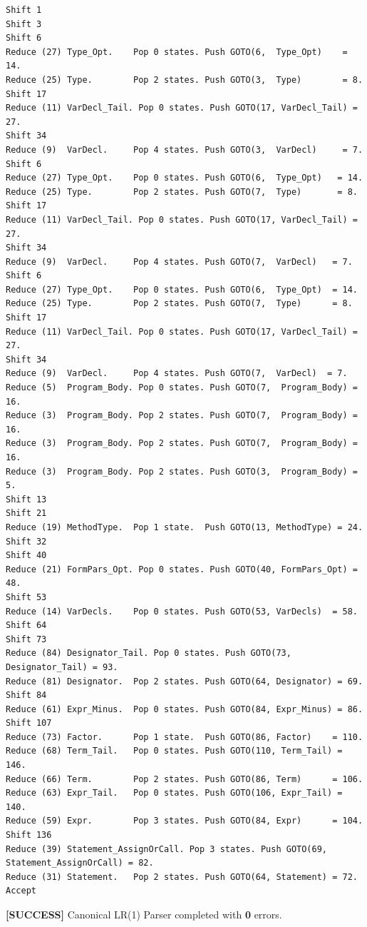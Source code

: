 \documentclass[11pt,a4paper]{article}
\begin{document}
\begin{lstlisting}[style=outputstyle]
Shift 1
Shift 3
Shift 6
Reduce (27) Type_Opt.    Pop 0 states. Push GOTO(6,  Type_Opt)    = 14.
Reduce (25) Type.        Pop 2 states. Push GOTO(3,  Type)        = 8.
Shift 17
Reduce (11) VarDecl_Tail. Pop 0 states. Push GOTO(17, VarDecl_Tail) = 27.
Shift 34
Reduce (9)  VarDecl.     Pop 4 states. Push GOTO(3,  VarDecl)     = 7.
Shift 6
Reduce (27) Type_Opt.    Pop 0 states. Push GOTO(6,  Type_Opt)   = 14.
Reduce (25) Type.        Pop 2 states. Push GOTO(7,  Type)       = 8.
Shift 17
Reduce (11) VarDecl_Tail. Pop 0 states. Push GOTO(17, VarDecl_Tail) = 27.
Shift 34
Reduce (9)  VarDecl.     Pop 4 states. Push GOTO(7,  VarDecl)   = 7.
Shift 6
Reduce (27) Type_Opt.    Pop 0 states. Push GOTO(6,  Type_Opt)  = 14.
Reduce (25) Type.        Pop 2 states. Push GOTO(7,  Type)      = 8.
Shift 17
Reduce (11) VarDecl_Tail. Pop 0 states. Push GOTO(17, VarDecl_Tail) = 27.
Shift 34
Reduce (9)  VarDecl.     Pop 4 states. Push GOTO(7,  VarDecl)  = 7.
Reduce (5)  Program_Body. Pop 0 states. Push GOTO(7,  Program_Body) = 16.
Reduce (3)  Program_Body. Pop 2 states. Push GOTO(7,  Program_Body) = 16.
Reduce (3)  Program_Body. Pop 2 states. Push GOTO(7,  Program_Body) = 16.
Reduce (3)  Program_Body. Pop 2 states. Push GOTO(3,  Program_Body) = 5.
Shift 13
Shift 21
Reduce (19) MethodType.  Pop 1 state.  Push GOTO(13, MethodType) = 24.
Shift 32
Shift 40
Reduce (21) FormPars_Opt. Pop 0 states. Push GOTO(40, FormPars_Opt) = 48.
Shift 53
Reduce (14) VarDecls.    Pop 0 states. Push GOTO(53, VarDecls)  = 58.
Shift 64
Shift 73
Reduce (84) Designator_Tail. Pop 0 states. Push GOTO(73, Designator_Tail) = 93.
Reduce (81) Designator.  Pop 2 states. Push GOTO(64, Designator) = 69.
Shift 84
Reduce (61) Expr_Minus.  Pop 0 states. Push GOTO(84, Expr_Minus) = 86.
Shift 107
Reduce (73) Factor.      Pop 1 state.  Push GOTO(86, Factor)    = 110.
Reduce (68) Term_Tail.   Pop 0 states. Push GOTO(110, Term_Tail) = 146.
Reduce (66) Term.        Pop 2 states. Push GOTO(86, Term)      = 106.
Reduce (63) Expr_Tail.   Pop 0 states. Push GOTO(106, Expr_Tail) = 140.
Reduce (59) Expr.        Pop 3 states. Push GOTO(84, Expr)      = 104.
Shift 136
Reduce (39) Statement_AssignOrCall. Pop 3 states. Push GOTO(69, Statement_AssignOrCall) = 82.
Reduce (31) Statement.   Pop 2 states. Push GOTO(64, Statement) = 72.
Accept
\end{lstlisting}

\begin{tcolorbox}[successbox]
\textbf{\color{SuccessGreen}[SUCCESS]} Canonical LR(1) Parser completed with \textbf{0} errors.
\end{tcolorbox}
\end{document}
